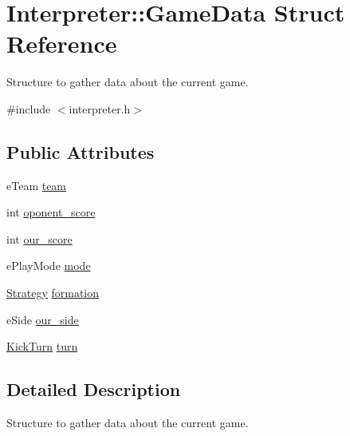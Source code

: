 \hypertarget{structInterpreter_1_1GameData}{
\section{Interpreter::GameData Struct Reference}
\label{structInterpreter_1_1GameData}
}


Structure to gather data about the current game.  




{\ttfamily \#include $<$interpreter.h$>$}

\subsection*{Public Attributes}
\begin{DoxyCompactItemize}
\item 
eTeam \hyperlink{structInterpreter_1_1GameData_a42e23781bbc08a16049f0478ba300424}{team}
\item 
int \hyperlink{structInterpreter_1_1GameData_adae988f2e4ebdf1d6b04d36a85f76708}{oponent\_\-score}
\item 
int \hyperlink{structInterpreter_1_1GameData_a0889548c1244e619028c24f7e8b1a9a7}{our\_\-score}
\item 
ePlayMode \hyperlink{structInterpreter_1_1GameData_a8db07331590b8e0acea1af74125073c0}{mode}
\item 
\hyperlink{classInterpreter_a0fb49436c8c14ca79e13f1cd78119088}{Strategy} \hyperlink{structInterpreter_1_1GameData_a1f97ae8675219e99c79735a7d9c3744b}{formation}
\item 
eSide \hyperlink{structInterpreter_1_1GameData_a92de919c4addb12feda7a29e40b95132}{our\_\-side}
\item 
\hyperlink{classInterpreter_ac7c3ba77d973ffbb84b12db662cfe643}{KickTurn} \hyperlink{structInterpreter_1_1GameData_a149f7f05ee020674156346057e9b60ba}{turn}
\end{DoxyCompactItemize}


\subsection{Detailed Description}
Structure to gather data about the current game. 

